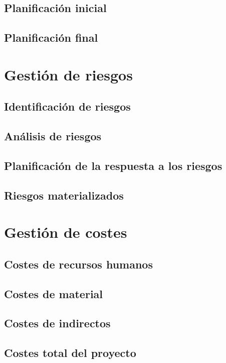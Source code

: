 \subsection{Planificación inicial}
\subsection{Planificación final}


\section{Gestión de riesgos}
\subsection{Identificación de riesgos}
\subsection{Análisis de riesgos}
\subsection{Planificación de la respuesta a los riesgos}
\subsection{Riesgos materializados}

\section{Gestión de costes}
\subsection{Costes de recursos humanos}
\subsection{Costes de material}
\subsection{Costes de indirectos}
\subsection{Costes total del proyecto}

